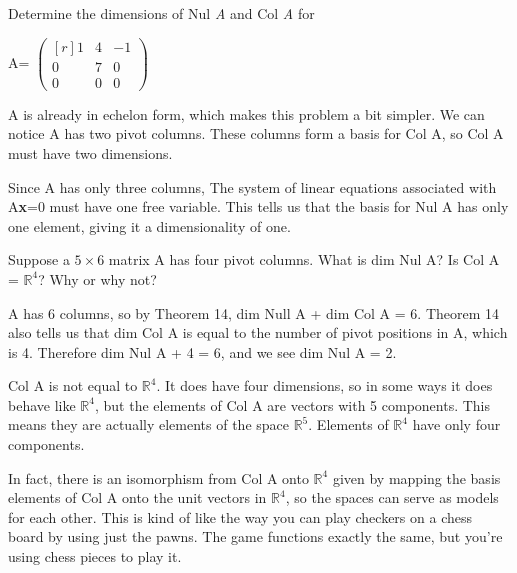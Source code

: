\documentclass[11pt]{amsart}
\begin{document}
\begin{center}
\begin{tcolorbox} [title=4.5.18 \hfill Isaac Baer , halign title=center] %

Determine the dimensions of Nul \textit{A} and Col \textit{A} for 

\vspace{5mm}

\begin{center}
A=
$
\begin{pmatrix*}[r]
1&4&-1\\
0&7&0\\
0&0&0
\end{pmatrix*}
$

\end{center}
\end{tcolorbox}

\end{center}

\vspace{10mm}

A is already in echelon form, which makes this problem a bit simpler. We can notice A has two pivot columns. These columns form a basis for Col A, so Col A must have two dimensions.

Since A has only three columns, The system of linear equations associated with A\textbf{x}=0 must have one free variable. This tells us that the basis for Nul A has only one element, giving it a dimensionality of one.

\clearpage

\begin{tcolorbox}[title=4.6.8 \hfill Isaac Baer]
Suppose a $5\times6$ matrix A has four pivot columns. What is dim Nul A? Is Col A = $\mathbb{R}^4$? Why or why not?

\end{tcolorbox}

A has 6 columns, so by Theorem 14, dim Null A + dim Col A = 6. Theorem 14 also tells us that dim Col A is equal to the number of pivot positions in A, which is 4. Therefore dim Nul A + 4 = 6, and we see dim Nul A = 2.

Col A is not equal to $\mathbb{R}^4$. It does have four dimensions, so in some ways it does behave like $\mathbb{R}^4$, but the elements of Col A are vectors with 5 components. This means they are actually elements of the space $\mathbb{R}^5$. Elements of $\mathbb{R}^4$ have only four components.

In fact, there is an isomorphism from Col A onto $\mathbb{R}^4$ given by mapping the basis elements of Col A onto the unit vectors in $\mathbb{R}^4$, so the spaces can serve as models for each other. This is kind of like the way you can play checkers on a chess board by using just the pawns. The game functions exactly the same, but you're using chess pieces to play it.
\end{document}
